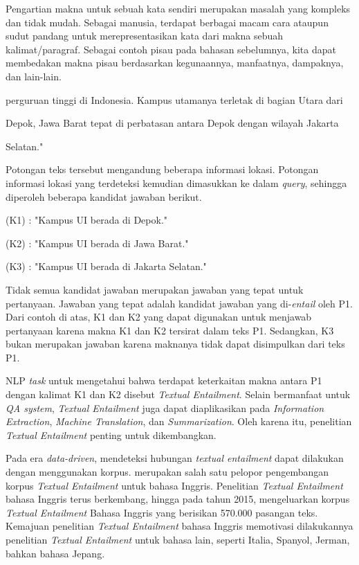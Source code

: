 Pengartian makna untuk sebuah kata sendiri merupakan masalah yang kompleks dan tidak mudah. Sebagai manusia, terdapat berbagai macam cara ataupun sudut pandang untuk merepresentasikan kata dari makna sebuah kalimat/paragraf. Sebagai contoh pisau pada bahasan sebelumnya, kita dapat membedakan makna pisau berdasarkan kegunaannya, manfaatnya, dampaknya, dan lain-lain.

perguruan tinggi di Indonesia. Kampus utamanya terletak di bagian Utara dari

Depok, Jawa Barat tepat di perbatasan antara Depok dengan wilayah Jakarta

Selatan." 

\noindent Potongan teks tersebut mengandung beberapa informasi lokasi. Potongan informasi lokasi yang terdeteksi kemudian dimasukkan ke dalam \textit{query}, sehingga diperoleh beberapa kandidat jawaban berikut.

(K1) : "Kampus UI berada di Depok."

(K2) : "Kampus UI berada di Jawa Barat."

(K3) : "Kampus UI berada di Jakarta Selatan."

Tidak semua kandidat jawaban merupakan jawaban yang tepat untuk pertanyaan. Jawaban yang tepat adalah kandidat jawaban yang di-\textit{entail} oleh P1. Dari contoh di atas, K1 dan K2 yang dapat digunakan untuk menjawab pertanyaan karena makna K1 dan K2 tersirat dalam teks P1.  Sedangkan, K3 bukan merupakan jawaban karena maknanya tidak dapat disimpulkan dari teks P1.

NLP \textit{task} untuk mengetahui bahwa terdapat keterkaitan makna antara P1 dengan kalimat K1 dan K2 disebut \textit{Textual Entailment}. Selain bermanfaat untuk \textit{QA system}, \textit{Textual Entailment} juga dapat diaplikasikan pada \textit{Information Extraction}, \textit{Machine Translation}, dan \textit{Summarization}. Oleh karena itu, penelitian \textit{Textual Entailment} penting untuk dikembangkan.

Pada era \textit{data-driven}, mendeteksi hubungan \textit{textual entailment} dapat dilakukan dengan menggunakan korpus. \cite{dagan2005} merupakan salah satu pelopor pengembangan korpus \textit{Textual Entailment} untuk bahasa Inggris. Penelitian \textit{Textual Entailment} bahasa Inggris terus berkembang, hingga pada tahun 2015, \cite{snli:emnlp2015} mengeluarkan korpus \textit{Textual Entailment} Bahasa Inggris yang berisikan 570.000 pasangan teks. Kemajuan penelitian \textit{Textual Entailment} bahasa Inggris memotivasi dilakukannya penelitian \textit{Textual Entailment} untuk bahasa lain, seperti Italia, Spanyol, Jerman, bahkan bahasa Jepang. 

